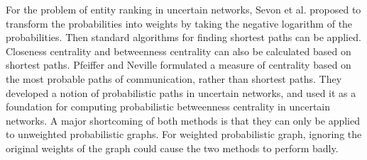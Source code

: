 \documentclass[\main/thesis.tex]{subfiles}
\begin{document}
For the problem of entity ranking in uncertain networks, Sevon et al. \cite{sevon2006link} proposed to transform the probabilities into weights by taking the negative logarithm of the probabilities. Then standard algorithms for finding shortest paths can be applied. Closeness centrality and betweenness centrality can also be calculated based on shortest paths. Pfeiffer and Neville \cite{pfeiffer2010probabilistic} formulated a measure of centrality based on the most probable paths of communication, rather than shortest paths. They developed a notion of probabilistic paths in uncertain networks, and used it as a foundation for computing probabilistic betweenness centrality in uncertain networks. A major shortcoming of both methods is that they can only be applied to unweighted probabilistic graphs. For weighted probabilistic graph, ignoring the original weights of the graph could cause the two methods to perform badly.
\end{document}
